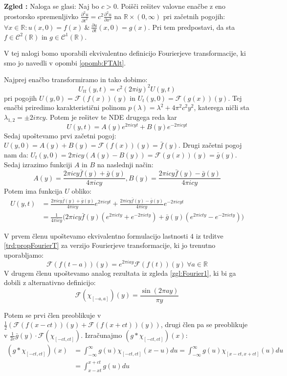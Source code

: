 \documentclass[a4paper, 10pt]{article}
\newcounter{zgledcount}
\newenvironment{zgled}{\begin{flushleft}\refstepcounter{zgledcount}\textbf{Zgled \arabic{zgledcount}:}}{\hfill\end{flushleft}}
\newcommand{\mth}[1]{\ensuremath{\mathbb{#1}}}
\newcommand{\R}{\mth{R}}
\begin{document}
		\begin{zgled}
			\label{zgl:FourierTPDEWave}
			Naloga se glasi: 
			Naj bo $c > 0$. Poišči rešitev valovne enačbe z eno prostorsko spremenljivko $\frac{\partial^2 u}{\partial t^2} = c^2\frac{\partial^2 u}{\partial x^2}$ na $\R\times (0, \infty)$ pri začetnih pogojih: $\forall x\in \R: u(x, 0) = f(x)~\&~\frac{\partial u}{\partial t}(x, 0) = g(x)$. Pri tem predpostavi, da sta $f\in \mathcal{C}^2(\R)$ in $g\in\mathcal{C}^1(\R)$.
			
			V tej nalogi bomo uporabili ekvivalentno definicijo Fourierjeve transformacije, ki smo jo navedli v opombi \ref{opomb:FTAlt}.
			
			Najprej enačbo transformiramo in tako dobimo: $$U_{tt}(y, t) = c^2(2\pi iy)^2U(y, t) $$ pri pogojih $U(y, 0) = \mathcal{F}(f(x))(y)$ in $U_t(y, 0) = \mathcal{F}(g(x))(y)$. Tej enačbi priredimo karakteristični polinom $p(\lambda)=\lambda^2 + 4\pi^2c^2y^2$, katerega ničli sta $\lambda_{1, 2} = \pm 2i\pi cy$. Potem je rešitev te NDE drugega reda kar $$U(y, t)= A(y)e^{2\pi i cyt} + B(y)e^{-2\pi icyt}$$
			Sedaj upoštevamo prvi začetni pogoj: $U(y, 0) = A(y) + B(y) = \mathcal{F}(f(x))(y) = \bar{f}(y)$. Drugi začetni pogoj nam da: $U_t(y, 0) = 2\pi icy(A(y) - B(y)) = \mathcal{F}(g(x))(y)=\bar{g}(y)$. Sedaj izrazimo funkciji $A$ in $B$ na naslednji način: $$A(y) = \frac{2\pi icy\bar{f}(y) +\bar{g}(y)}{4\pi icy}, B(y) = \frac{2\pi icy\bar{f}(y) -\bar{g}(y)}{4\pi icy}$$
			Potem ima funkcija $U$ obliko: \begin{align*}
				U(y, t) &=  \frac{2\pi icy\bar{f}(y) +\bar{g}(y)}{4\pi icy}e^{2\pi icyt} + \frac{2\pi icy\bar{f}(y) -\bar{g}(y)}{4\pi icy}e^{-2\pi icyt} \\
				&= \frac{1}{4\pi icy}\big(2\pi icy\bar{f}(y)(e^{2\pi icty} + e^{-2\pi icty}) + \bar{g}(y)(e^{2\pi icty} - e^{-2\pi icty})\big)
				\end{align*}
				
				V prvem členu upoštevamo ekvivalentno formulacijo lastnosti $4$ iz trditve \ref{trd:propFourierT} za verzijo Fourierjeve transformacije, ki jo trenutno uporabljamo: $$\mathcal{F}(f(t-a))(y) = e^{2\pi iay}\mathcal{F}(f(t))(y) ~\forall a\in\R$$ V drugem členu upoštevamo analog rezultata iz zgleda \ref{zgl:Fourier1}, ki bi ga dobili z alternativno definicijo: $$\mathcal{F}(\chi_{[-a, a]})(y) = \frac{\sin(2\pi ay)}{\pi y}$$
				
				Potem se prvi člen preoblikuje v $\frac{1}{2}(\mathcal{F}(f(x-ct))(y) + \mathcal{F}(f(x + ct))(y))$, drugi člen pa se preoblikuje v $\frac{1}{2c}\bar{g}(y)\cdot\mathcal{F}(\chi_{[-ct, ct]})$. Izračunajmo $(g*\chi_{[-ct, ct]})(x)$: \begin{align*}
					(g*\chi_{[-ct, ct]})(x) &= \int_{-\infty}^{\infty}g(u)\chi_{[-ct, ct]}(x-u)du = \int_{-\infty}^{\infty}g(u)\chi_{[x-ct, x+ct]}(u)du \\
					&= \int_{x-xt}^{x+ct}g(u)du
				\end{align*}
				

\end{zgled}
\end{document}

